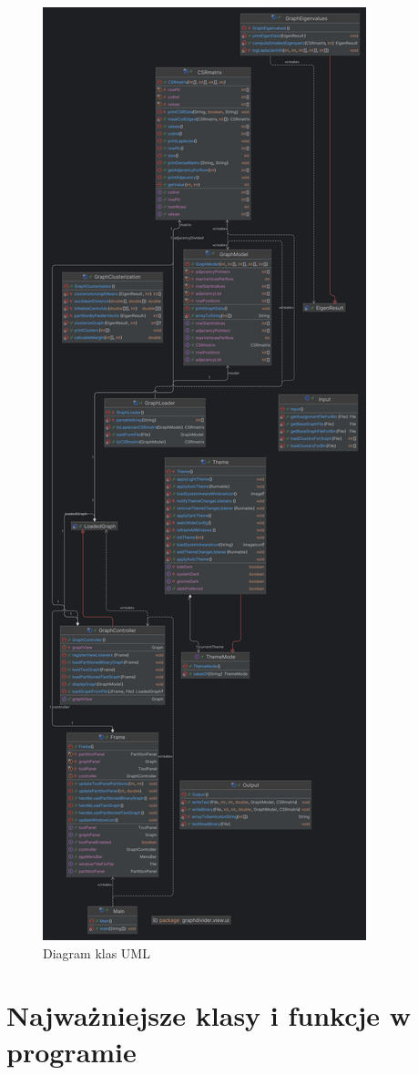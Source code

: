 \documentclass{article}
\begin{document}
    \begin{figure}[H]
        \centering
        \includegraphics[width=0.45\linewidth]{img/UML.png}
        \caption{Diagram klas UML}
        \label{fig:uml}
    \end{figure}



\section{Najważniejsze klasy i funkcje w programie}
\end{document}
